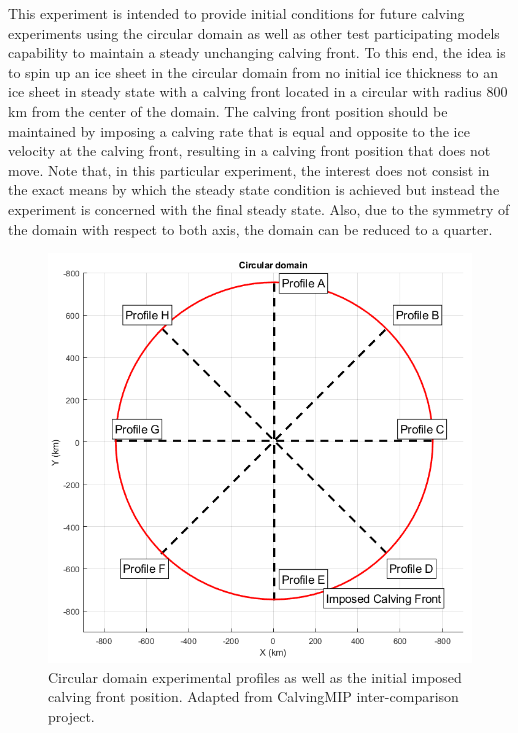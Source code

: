 \documentclass{article}
\begin{document}
This experiment is intended to provide initial conditions for future calving experiments using the circular domain as well as other test participating models capability to maintain a steady unchanging calving front. To this end, the idea is to spin up an ice sheet in the circular domain from no initial ice thickness to an ice sheet in steady state with a calving front located in a circular with radius 800 km from the center of the domain. The calving front position should be maintained by imposing a calving rate that is equal and opposite to the ice velocity at the calving front, resulting in a calving front position that does not move.
Note that, in this particular experiment, the interest does not consist in the exact means by which the steady state condition is achieved but instead the experiment is concerned with the final steady state. 
Also, due to the symmetry of the domain with respect to both axis, the domain can be reduced to a quarter.

\begin{figure}[!h]
	\centering
	\includegraphics[width=0.7\linewidth]{../fig/cone.png}
	\caption{Circular domain experimental profiles as well as the initial imposed calving front position. Adapted from CalvingMIP inter-comparison project.}
	\label{cone_profile}
\end{figure}
\end{document}
